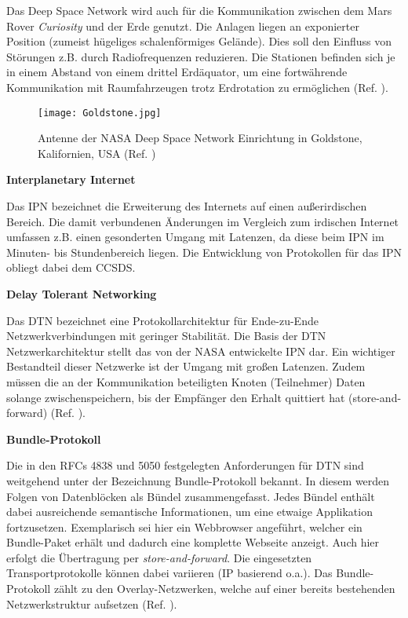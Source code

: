Das Deep Space Network wird auch f{\"u}r die Kommunikation zwischen dem Mars
Rover \textit{Curiosity} und der Erde genutzt. Die Anlagen liegen an exponierter Position
(zumeist h{\"u}geliges schalenf{\"o}rmiges Gel{\"a}nde). Dies soll den
Einfluss von St{\"o}rungen z.B. durch Radiofrequenzen reduzieren. Die Stationen
befinden sich je in einem Abstand von einem drittel Erd{\"a}quator, um eine
fortw{\"a}hrende Kommunikation mit Raumfahrzeugen trotz Erdrotation zu
erm{\"o}glichen (Ref. \cite{web6}).

\begin{figure}[H]
\centering
\texttt{[image: Goldstone.jpg]}
\caption[Antenne der NASA Deep Space Network Einrichtung in Goldstone, Kalifornien, USA]
{Antenne der NASA Deep Space Network Einrichtung in Goldstone, Kalifornien, USA (Ref. \cite{imgGoldstone})}
\label{fig:Goldstone}
\end{figure}

\textbf{Interplanetary Internet}

Das \gls{IPN} bezeichnet die Erweiterung des Internets
auf einen au{\ss}erirdischen Bereich. Die damit verbundenen {\"A}nderungen im
Vergleich zum irdischen Internet umfassen z.B. einen gesonderten Umgang mit
Latenzen, da diese beim \gls{IPN} im Minuten- bis Stundenbereich liegen. Die
Entwicklung von Protokollen f{\"u}r das \gls{IPN} obliegt dabei dem \gls{CCSDS}.

\textbf{Delay Tolerant Networking}

Das \gls{DTN} bezeichnet eine Protokollarchitektur f{\"u}r
Ende-zu-Ende Netzwerkverbindungen mit geringer Stabilit{\"a}t. Die Basis der
\gls{DTN} Netzwerkarchitektur stellt das von der NASA entwickelte \gls{IPN} dar. Ein wichtiger
Bestandteil dieser Netzwerke ist der Umgang mit gro{\ss}en Latenzen. Zudem
m{\"u}ssen die an der Kommunikation beteiligten Knoten (Teilnehmer)
Daten solange zwischenspeichern, bis der Empf{\"a}nger den Erhalt quittiert hat
(store-and-forward) (Ref. \cite{web3}).

\textbf{Bundle-Protokoll}

Die in den RFCs 4838 und 5050 festgelegten Anforderungen f{\"u}r \gls{DTN} sind
weitgehend unter der Bezeichnung Bundle-Protokoll bekannt. In diesem werden
Folgen von Datenbl{\"o}cken als B{\"u}ndel zusammengefasst. Jedes B{\"u}ndel enth{\"a}lt
dabei ausreichende semantische Informationen, um eine etwaige Applikation
fortzusetzen. Exemplarisch sei hier ein Webbrowser angef{\"u}hrt, welcher ein
Bundle-Paket erh{\"a}lt und dadurch eine komplette Webseite anzeigt. Auch hier
erfolgt die {\"U}bertragung per \textit{store-and-forward}. Die eingesetzten
Transportprotokolle k{\"o}nnen dabei variieren (\gls{IP} basierend o.a.). Das
Bundle-Protokoll z{\"a}hlt zu den Overlay-Netzwerken, welche
auf einer bereits bestehenden Netzwerkstruktur aufsetzen (Ref. \cite{web1}).

